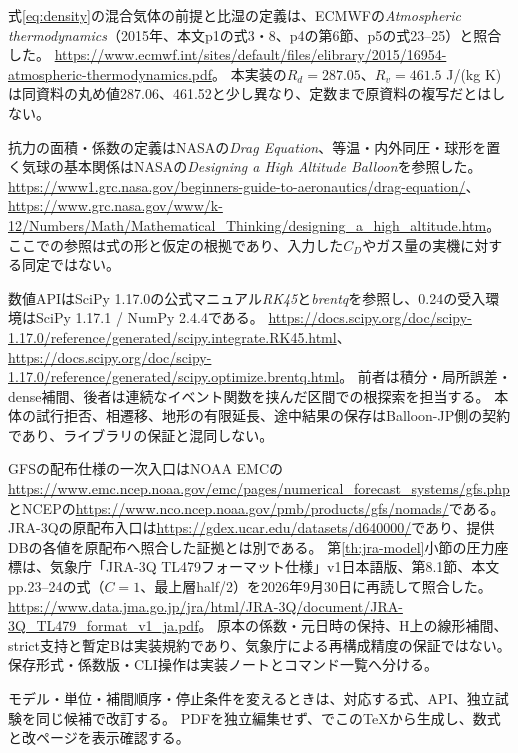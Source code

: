 \documentclass[11pt,a4paper]{article}
\begin{document}
式\eqref{eq:density}の混合気体の前提と比湿の定義は、ECMWFの\emph{Atmospheric thermodynamics}（2015年、本文p1の式3・8、p4の第6節、p5の式23--25）と照合した。
\url{https://www.ecmwf.int/sites/default/files/elibrary/2015/16954-atmospheric-thermodynamics.pdf}。
本実装の$R_d=287.05$、$R_v=461.5$ J/(kg K)は同資料の丸め値287.06、461.52と少し異なり、定数まで原資料の複写だとはしない。

抗力の面積・係数の定義はNASAの\emph{Drag Equation}、等温・内外同圧・球形を置く気球の基本関係はNASAの\emph{Designing a High Altitude Balloon}を参照した。
\url{https://www1.grc.nasa.gov/beginners-guide-to-aeronautics/drag-equation/}、
\url{https://www.grc.nasa.gov/www/k-12/Numbers/Math/Mathematical_Thinking/designing_a_high_altitude.htm}。
ここでの参照は式の形と仮定の根拠であり、入力した$C_D$やガス量の実機に対する同定ではない。

数値APIはSciPy 1.17.0の公式マニュアル\emph{RK45}と\emph{brentq}を参照し、0.24の受入環境はSciPy 1.17.1 / NumPy 2.4.4である。
\url{https://docs.scipy.org/doc/scipy-1.17.0/reference/generated/scipy.integrate.RK45.html}、
\url{https://docs.scipy.org/doc/scipy-1.17.0/reference/generated/scipy.optimize.brentq.html}。
前者は積分・局所誤差・dense補間、後者は連続なイベント関数を挟んだ区間での根探索を担当する。
本体の試行拒否、相遷移、地形の有限延長、途中結果の保存はBalloon-JP側の契約であり、ライブラリの保証と混同しない。

GFSの配布仕様の一次入口はNOAA EMCの\url{https://www.emc.ncep.noaa.gov/emc/pages/numerical_forecast_systems/gfs.php}とNCEPの\url{https://www.nco.ncep.noaa.gov/pmb/products/gfs/nomads/}である。
JRA-3Qの原配布入口は\url{https://gdex.ucar.edu/datasets/d640000/}であり、提供DBの各値を原配布へ照合した証拠とは別である。
第\ref{th:jra-model}小節の圧力座標は、気象庁「JRA-3Q TL479フォーマット仕様」v1日本語版、第8.1節、本文pp.23--24の式（$C=1$、最上層half/2）を2026年9月30日に再読して照合した。
\url{https://www.data.jma.go.jp/jra/html/JRA-3Q/document/JRA-3Q_TL479_format_v1_ja.pdf}。
原本の係数・元日時の保持、H上の線形補間、strict支持と暫定Bは実装規約であり、気象庁による再構成精度の保証ではない。
保存形式・係数版・CLI操作は実装ノートとコマンド一覧へ分ける。

モデル・単位・補間順序・停止条件を変えるときは、対応する式、API、独立試験を同じ候補で改訂する。
PDFを独立編集せず、でこのTeXから生成し、数式と改ページを表示確認する。
\end{document}
